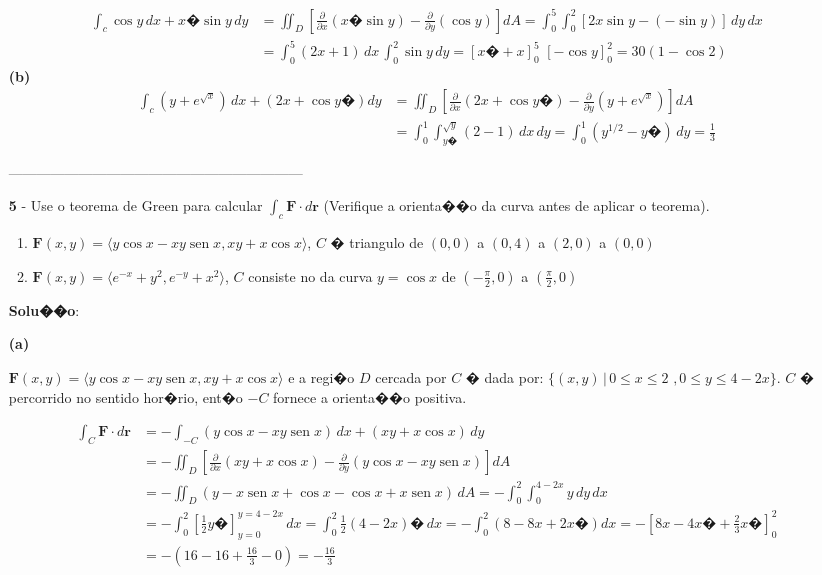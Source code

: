 \documentclass[12pt]{article}
\DeclareMathOperator{\sen}{sen}
\begin{document}
\begin{enumerate}
          \begin{align*}
              \int_{c}\cos y\,dx + x�\sin y\,dy & =\iint_{D} \left[\frac{\partial}{\partial x}(x� \sin y) - \frac{\partial}{\partial y}(\cos y)\right]dA=  \int_0^5 \int_0^2[2x \sin y - (-\sin y)]\,dy\,dx \\&=\int_0^5 (2x+1)\,dx\,\int_0^2 \sin y \,dy = \left[x�+x \right]_0^5 \,\, \left[-\cos y \right]_0^2 = 30(1- \cos 2)
          \end{align*}
          \textbf{(b)}
          \begin{align*}
              \int_c (y+ e^{\sqrt{x}})\,dx + (2x + \cos y�)dy & = \iint_{D} \left[\frac{\partial}{\partial x}(2x + \cos y�) - \frac{\partial}{\partial y}(y+ e^{\sqrt{x}})\right]dA \\&= \int_0^1 \int_{y�}^{\sqrt{y}} (2-1)\,dx\,dy = \int_0^1 (y^{1/2}-y�)\,dy = \frac{1}{3}
          \end{align*}
          \begin{center}
              ---------------------------------------------------------------
          \end{center}
    \item[\textbf{5}]- Use o teorema de Green para calcular $\int_c \textbf{F}\cdot d\textbf{r} $ (Verifique a orienta��o da curva antes de aplicar o teorema).
          \begin{enumerate}
              \item $\textbf{F}(x,y)= \langle y\cos x - xy\sen x, xy + x\cos x \rangle $, $C$ � triangulo de $(0,0)$ a $(0,4)$ a $(2,0)$ a $(0,0)$
              \item $\textbf{F}(x,y)= \langle e^{-x} + y^2, e^{-y} + x^2 \rangle $, $C$ consiste no da curva $y = \cos x $ de $(-\frac{\pi}{2},0)$ a $(\frac{\pi}{2},0)$
          \end{enumerate}

          \textbf{Solu��o}:

          \textbf{(a)}

          $\textbf{F}(x,y)= \langle y\cos x - xy\sen x, xy + x\cos x \rangle $ e a regi�o $D$ cercada por $C$ � dada por: $\lbrace(x,y)\,|\,0\leq x \leq 2\,\, , 0 \leq y \leq 4-2x\rbrace$. $C$ � percorrido no sentido hor�rio, ent�o $-C$ fornece a orienta��o positiva.

          \begin{align*}
              \int_C \textbf{F}\cdot d\textbf{r} & = -\int_{-C} (y\cos x - xy\sen x)\,dx + (xy + x\cos x)\,dy \\& = - \iint_{D} \left[\frac{\partial}{\partial x}(xy + x\cos x) - \frac{\partial}{\partial y}(y\cos x - xy\sen x)\right]dA\\& = -\iint_{D} (y - x\sen x + \cos x - \cos x + x\sen x)\,dA = -\int_0^2 \int_0^{4-2x}y\,dy\,dx \\& = -\int_0^2 \left[\frac{1}{2}y� \right]_{y=0}^{y=4-2x}\,dx = \int_0^2 \frac{1}{2}(4-2x)�\,dx = -\int_0^2(8-8x+2x�)dx = - \left[8x-4x�+\frac{2}{3}x� \right]_0^2\\&= -\left(16-16+\frac{16}{3}-0\right)=-\frac{16}{3}
          \end{align*}


\end{enumerate}
\end{document}
